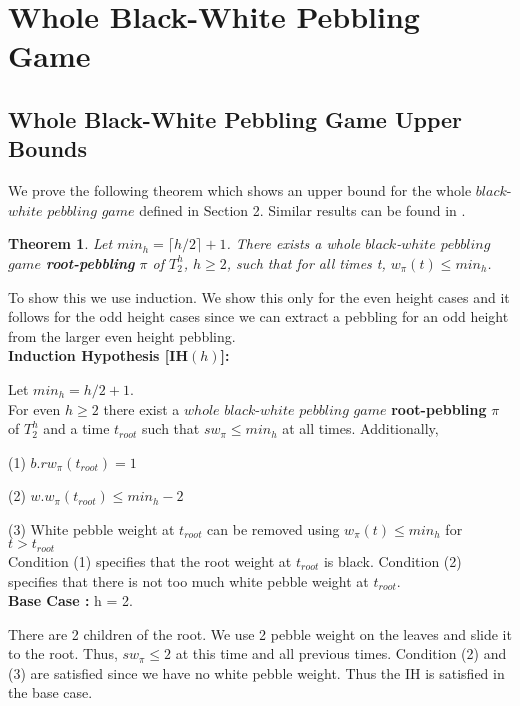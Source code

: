 \documentclass[12pt]{article}
\newtheorem{theorem}{Theorem}[subsection]
\newcommand{\troot}{t_{root}}
\begin{document}
\newpage




\section{Whole Black-White Pebbling Game} 

\subsection{Whole Black-White Pebbling Game Upper Bounds} 

We prove the following theorem which shows an upper bound for the whole $black$-$white$ $pebbling$ $game$ defined in Section 2. Similar results can be found in \cite{c:pebjournal}.

\begin{theorem}
Let  $min_h = \lceil h/2\rceil + 1$.
There exists a whole $black$-$white$ $pebbling$ $game$ {\bf root-pebbling} $\pi$ of $T^h_2$, $h \geq 2$, such
that for all times t, $w_\pi(t) \le min_h$.
\end{theorem}

\noindent
To show this we use induction. We show this only for the even height cases and it follows for the odd height cases since we can extract a pebbling for an odd height from the larger even height pebbling.\\

\noindent
{\bf Induction Hypothesis [IH$(h)$]:} 

\noindent
Let $min_h = h/2 + 1$.\\
For even $h\geq 2$
there exist a $whole$ $black$-$white$ $pebbling$ $game$ {\bf root-pebbling} $\pi$ of $T_2^h$ and a time $\troot$ such that $sw_\pi \leq min_h$ at all times. Additionally,

(1) $b.rw_\pi(\troot) = 1$

(2) $w.w_\pi(\troot) \leq min_h-2$

(3) White pebble weight at $\troot$ can be removed using $w_\pi(t) \leq min_h$ for  $t > \troot$\\

Condition (1) specifies that the root weight at $\troot$ is black. Condition (2) specifies that there is not too much white pebble weight at $\troot$.\\

\noindent
{\bf Base Case :} h = 2.

There are 2 children of the root. We use 2 pebble weight on the leaves and slide it to the root. Thus, $sw_\pi \leq 2$ at this time and all previous times. Condition (2) and (3) are satisfied since we have no white pebble weight. Thus the IH is satisfied in the base case.\\
\end{document}
